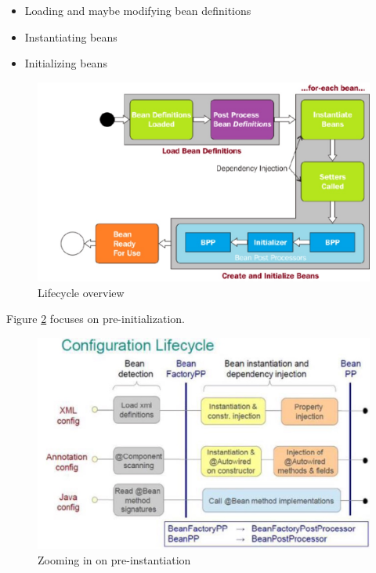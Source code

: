 \documentclass{scrartcl}
\begin{document}
\begin{itemize}
    \item Loading and maybe modifying bean definitions
    \item Instantiating beans
    \item Initializing beans
\end{itemize}

\begin{figure}
    \centering
    \includegraphics[width=1\linewidth]{bean-lifecycle-3}
    \caption{Lifecycle overview}
    \label{fig:bean-lifecycle-3}
\end{figure}

Figure \ref{fig:bean-lifecycle-2} focuses on pre-initialization.

\begin{figure}
    \centering
    \includegraphics[width=1\linewidth]{bean-lifecycle-2}
    \caption{Zooming in on pre-instantiation}
    \label{fig:bean-lifecycle-2}
\end{figure}
\end{document}
